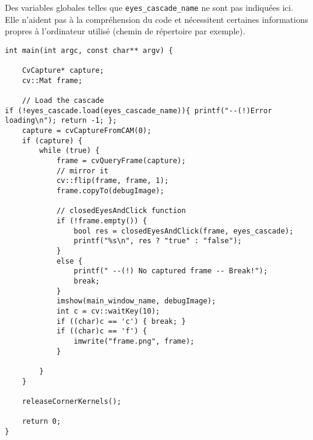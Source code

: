 Des variables globales telles que \lstinline=eyes_cascade_name= ne sont pas indiquées ici. Elle n’aident pas à la compréhension du code et nécessitent certaines informations propres à l’ordinateur utilisé (chemin de répertoire par exemple).

\begin{lstlisting}
int main(int argc, const char** argv) {

	CvCapture* capture;
	cv::Mat frame;

	// Load the cascade
if (!eyes_cascade.load(eyes_cascade_name)){ printf("--(!)Error loading\n"); return -1; };
	capture = cvCaptureFromCAM(0);
	if (capture) {
		while (true) {
			frame = cvQueryFrame(capture);
			// mirror it
			cv::flip(frame, frame, 1);
			frame.copyTo(debugImage);

			// closedEyesAndClick function
			if (!frame.empty()) {
				bool res = closedEyesAndClick(frame, eyes_cascade);
				printf("%s\n", res ? "true" : "false");
			}
			else {
				printf(" --(!) No captured frame -- Break!");
				break;
			}
			imshow(main_window_name, debugImage);
			int c = cv::waitKey(10);
			if ((char)c == 'c') { break; }
			if ((char)c == 'f') {
				imwrite("frame.png", frame);
			}

		}
	}

	releaseCornerKernels();

	return 0;
}
\end{lstlisting}
